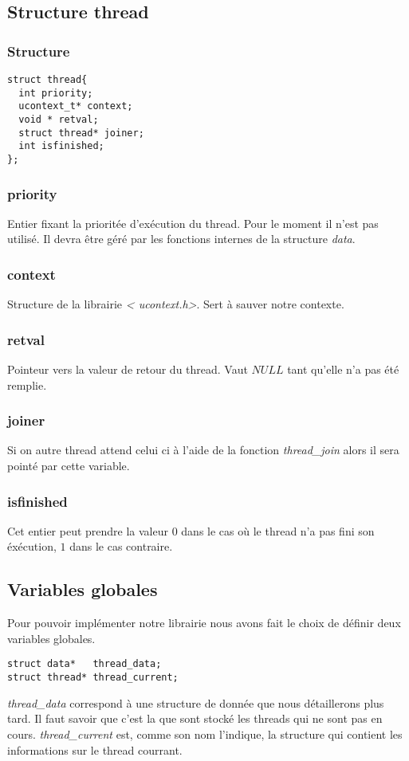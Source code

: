 \subsection{Structure thread}
\subsubsection{Structure}

\begin{verbatim}
struct thread{
  int priority;
  ucontext_t* context;
  void * retval;
  struct thread* joiner;
  int isfinished;
};
\end{verbatim}

\subsubsection{priority}
Entier fixant la prioritée d'exécution du thread. Pour le moment il
n'est pas utilisé.  Il devra être géré par les fonctions internes de
la structure \textit{data}.

\subsubsection{context}
Structure de la librairie \textit{\textless
ucontext.h\textgreater}. Sert à sauver notre contexte.
 
\subsubsection{retval}
Pointeur vers la valeur de retour du thread. Vaut $NULL$ tant qu'elle
n'a pas été remplie.

\subsubsection{joiner}
Si on autre thread attend celui ci à l'aide de la fonction
\textit{thread\_join} alors il sera pointé par cette variable.

\subsubsection{isfinished}
Cet entier peut prendre la valeur $0$ dans le cas où le thread n'a pas
fini son éxécution, $1$ dans le cas contraire.


\subsection{Variables globales}
Pour pouvoir implémenter notre librairie nous avons fait le choix de
définir deux variables globales.
\begin{verbatim}
struct data*   thread_data;
struct thread* thread_current;
\end{verbatim}
\textit{thread\_data} correspond à une structure de donnée que nous
détaillerons plus tard. Il faut savoir que c'est la que sont stocké
les threads qui ne sont pas en cours.  \textit{thread\_current} est,
comme son nom l'indique, la structure qui contient les informations
sur le thread courrant.


